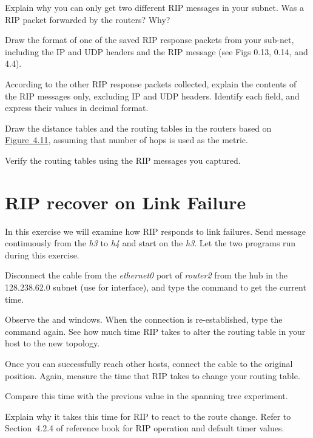 \documentclass{../UTNetLab}
\begin{document}
\begin{report}
    \item Explain why you can only get two different RIP messages in your subnet.
    Was a RIP packet forwarded by the routers?
    Why?

    \item Draw the format of one of the saved RIP response packets from your sub-net, including the IP and UDP headers and the RIP message (see Figs 0.13, 0.14, and 4.4).

    \item According to the other RIP response packets collected, explain the contents of the RIP messages only, excluding IP and UDP headers.
    Identify each field, and express their values in decimal format.


    \item Draw the distance tables and the routing tables in the routers based on \hyperref[fig:4.11]{Figure~4.11}, assuming that number of hops is used as the metric.

    \item Verify the routing tables using the RIP messages you captured.
\end{report}


\section{RIP recover on Link Failure}
In this exercise we will examine how RIP responds to link failures.
Send  message continuously from the \textit{h3} to \textit{h4} and start  on the \textit{h3}.
Let the two programs run during this exercise.

Disconnect the cable from the \textit{ethernet0} port of \textit{router2} from the hub in the 128.238.62.0 subnet (use  for interface), and type the  command to get the current time.

Observe the  and  windows.
When the connection is re-established, type the  command again.
See how much time RIP takes to alter the routing table in your host to the new topology.

Once you can successfully reach other hosts, connect the cable to the original position.
Again, measure the time that RIP takes to change your routing table.

\begin{report}
    \item Compare this time with the previous value in the spanning tree experiment.

    \item Explain why it takes this time for RIP to react to the route change.
    Refer to Section~4.2.4 of reference book for RIP operation and default timer values.
\end{report}
\end{document}
